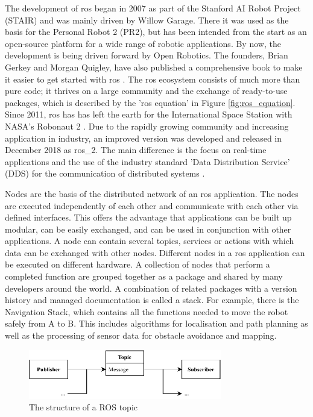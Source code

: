 The development of \gls{ros} began in 2007 as part of the Stanford AI Robot Project (STAIR) and was mainly driven by Willow Garage. There it was used as the basis for the Personal Robot 2 (PR2), but has been intended from the start as an open-source platform for a wide range of robotic applications. By now, the development is being driven forward by Open Robotics. The founders, Brian Gerkey and Morgan Quigley, have also published a comprehensive book to make it easier to get started with \gls{ros} \cite{quigley_programming_2015}. The \gls{ros} ecosystem consists of much more than pure code; it thrives on a large community and the exchange of ready-to-use packages, which is described by the '\gls{ros} equation' in Figure \ref{fig:ros_equation}. Since 2011, \gls{ros} has has left the earth for the International Space Station with NASA's Robonaut 2 \cite{koubaa_ros_2016}. Due to the rapidly growing community and increasing application in industry, an improved version was developed and released in December 2018 as \gls{ros_2}. The main difference is the focus on real-time applications and the use of the industry standard 'Data Distribution Service' (DDS) for the communication of distributed systems \cite{macenski_robot_2022}.

Nodes are the basis of the distributed network of an \gls{ros} application. The nodes are executed independently of each other and communicate with each other via defined interfaces. This offers the advantage that applications can be built up modular, can be easily exchanged, and can be used in conjunction with other applications. A node can contain several topics, services or actions with which data can be exchanged with other nodes. Different nodes in a \gls{ros} application can be executed on different hardware. A collection of nodes that perform a completed function are grouped together as a package and shared by many developers around the world. A combination of related packages with a version history and managed documentation is called a stack. For example, there is the Navigation Stack, which contains all the functions needed to move the robot safely from A to B. This includes algorithms for localisation and path planning as well as the processing of sensor data for obstacle avoidance and mapping.

\begin{figure}[h]
    \centering
    \includegraphics[width=0.75\textwidth]{figures/02_state_of_the_art/topics.pdf}
    \caption{The structure of a ROS topic}
    \label{fig:topics}
\end{figure}

